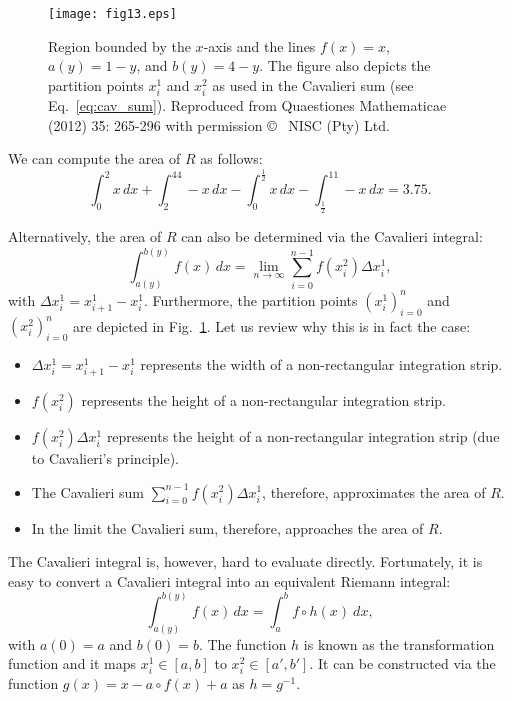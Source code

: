 \documentclass{article}
\theoremstyle{theorem}
\theoremstyle{definition}
\begin{document}
\begin{figure}[htb]
\centering
\texttt{[image: fig13.eps]}
\caption{Region bounded by the $x$-axis and the lines $f(x)=x$, $a(y)=1-y$, and $b(y)=4-y$. The figure also depicts the partition points $x_i^1$ and $x_i^2$ as used in the Cavalieri sum (see Eq.~\eqref{eq:cav_sum}). Reproduced from Quaestiones Mathematicae (2012) 35: 265-296 with permission \copyright~ NISC (Pty) Ltd.}
\label{fig:caval2}
\end{figure}

\noindent
We can compute the area of $R$ as follows:
\begin{equation}
\int_0^2x\, dx+\int_2^44-x\, dx- \int_0^{\frac{1}{2}}x\, dx-\int_{\frac{1}{2}}^11-x\, dx = 3.75. 
\end{equation}

\noindent
Alternatively, the area of $R$ can also be determined via the Cavalieri integral:
\begin{equation}
\label{eq:caval1}
\int_{a(y)}^{b(y)}f(x)\, dx = \lim_{n\to \infty}\sum_{i=0}^{n-1} f(x_i^2)\Delta x_i^1,
\end{equation}
with $\Delta x_i^1 = x_{i+1}^1 - x_i^1$. Furthermore, the partition points $(x_i^1)_{i=0}^{n}$ and $(x_i^2)_{i=0}^{n}$ are depicted in Fig.~\ref{fig:caval2}. Let us review why this is in fact the case:
\begin{itemize}
 \item $\Delta x_i^1 = x_{i+1}^1 - x_i^1$ represents the width of a non-rectangular integration strip.
 \item $f(x_i^2)$ represents the height of a non-rectangular integration strip.
 \item $f(x_i^2)\Delta x_i^1$ represents the height of a non-rectangular integration strip (due to Cavalieri's principle).
 \item The Cavalieri sum $\sum_{i=0}^{n-1} f(x_i^2)\Delta x_i^1$, therefore, approximates the area of $R$.
 \item In the limit the Cavalieri sum, therefore, approaches the area of $R$.
\end{itemize}

\noindent
The Cavalieri integral is, however, hard to evaluate directly. Fortunately, it is easy to convert a Cavalieri integral into an equivalent Riemann integral:
\begin{equation}
\int_{a(y)}^{b(y)}f(x)\, dx = \int_{a}^{b} f\circ h(x)~dx, 
\end{equation}
with $a(0) = a$ and $b(0)=b$. The function $h$ is known as the transformation function and it maps $x_i^1\in[a,b]$ to $x_i^2\in[a',b']$. It can be constructed via the function $g(x) = x - a\circ f(x) + a$ as 
$h=g^{-1}$.
\end{document}
